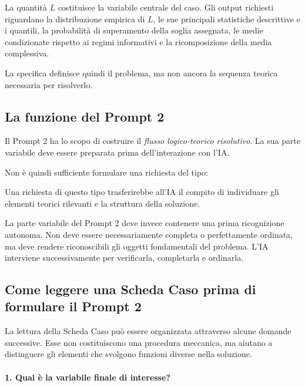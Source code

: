 La quantit\`{a} $L$ costituisce la variabile centrale del caso. Gli output richiesti riguardano la distribuzione empirica di $L$, le sue
principali statistiche descrittive e i quantili, la probabilit\`{a} di
superamento della soglia assegnata, le medie condizionate rispetto ai regimi
informativi e la ricomposizione della media complessiva.

La specifica definisce quindi il problema, ma non ancora la sequenza teorica
necessaria per risolverlo.

\subsection{La funzione del Prompt 2}

Il Prompt 2 ha lo scopo di costruire il \emph{flusso logico-teorico
risolutivo}. La sua parte variabile deve essere preparata prima
dell'interazione con l'IA.

Non \`{e} quindi sufficiente formulare una richiesta del tipo:

\begin{quote}
\small
{}
\end{quote}

Una richiesta di questo tipo trasferirebbe all'IA il compito di individuare
gli elementi teorici rilevanti e la struttura della soluzione.

La parte variabile del Prompt 2 deve invece contenere una prima ricognizione
autonoma. Non deve essere necessariamente completa o perfettamente ordinata,
ma deve rendere riconoscibili gli oggetti fondamentali del problema. L'IA
interviene successivamente per verificarla, completarla e ordinarla.

\subsection{Come leggere una Scheda Caso prima di formulare il Prompt 2}

La lettura della Scheda Caso pu\`{o} essere organizzata attraverso alcune
domande successive. Esse non costituiscono una procedura meccanica, ma aiutano
a distinguere gli elementi che svolgono funzioni diverse nella soluzione.

\paragraph{1. Qual \`{e} la variabile finale di interesse?}

